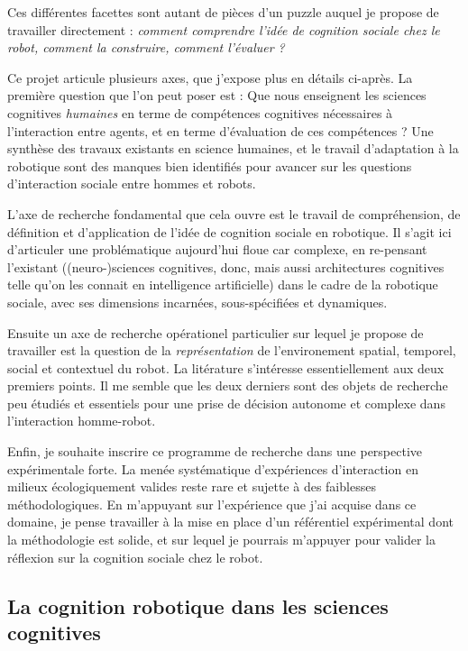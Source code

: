 \documentclass[a4paper]{article}
\begin{document}
Ces différentes facettes sont autant de pièces d'un puzzle auquel je propose de
travailler directement : \emph{comment comprendre l'idée de \emph{cognition
sociale} chez le robot, comment la construire, comment l'évaluer ?}

Ce projet articule plusieurs axes, que j'expose plus en détails ci-après. La
première question que l'on peut poser est : Que nous enseignent les sciences
cognitives \emph{humaines} en terme de compétences cognitives nécessaires à
l'interaction entre agents, et en terme d'évaluation de ces compétences ? Une
synthèse des travaux existants en science humaines, et le travail d'adaptation
à la robotique sont des manques bien identifiés pour avancer sur les questions
d'interaction sociale entre hommes et robots.

L'axe de recherche fondamental que cela ouvre est le travail de compréhension,
de définition et d'application de l'idée de cognition sociale en robotique. Il
s'agit ici d'articuler une problématique aujourd'hui floue car complexe, en
re-pensant l'existant ((neuro-)sciences cognitives, donc, mais aussi
architectures cognitives telle qu'on les connait en intelligence artificielle)
dans le cadre de la robotique sociale, avec ses dimensions incarnées,
sous-spécifiées et dynamiques.

Ensuite un axe de recherche opérationel particulier sur lequel je propose de
travailler est la question de la \emph{représentation} de l'environement
spatial, temporel, social et contextuel du robot. La litérature s'intéresse
essentiellement aux deux premiers points. Il me semble que les deux derniers
sont des objets de recherche peu étudiés et essentiels pour une prise de
décision autonome et complexe dans l'interaction homme-robot.

Enfin, je souhaite inscrire ce programme de recherche dans une perspective
expérimentale forte. La menée systématique d'expériences d'interaction en milieux
écologiquement valides reste rare et sujette à des faiblesses méthodologiques.
En m'appuyant sur l'expérience que j'ai acquise dans ce domaine, je pense
travailler à la mise en place d'un référentiel expérimental dont la méthodologie
est solide, et sur lequel je pourrais m'appuyer pour valider la réflexion sur la
cognition sociale chez le robot.

\subsection{La cognition robotique dans les sciences cognitives}
\end{document}
